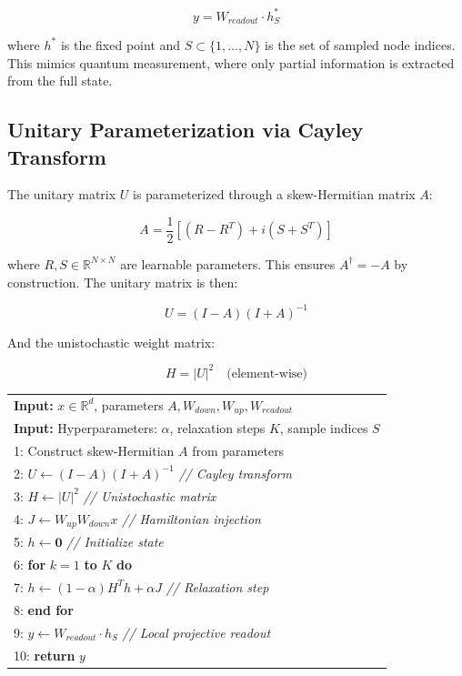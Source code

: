 \documentclass[11pt,a4paper]{article}
\newcommand{\R}{\mathbb{R}}
\begin{document}
\begin{equation}
\label{eq:readout}
y = W_{readout} \cdot h^*_S
\end{equation}

where $h^*$ is the fixed point and $S \subset \{1, \ldots, N\}$ is the set of sampled node indices. This mimics quantum measurement, where only partial information is extracted from the full state.

\subsection{Unitary Parameterization via Cayley Transform}

The unitary matrix $U$ is parameterized through a skew-Hermitian matrix $A$:

\begin{equation}
A = \frac{1}{2}\left[(R - R^T) + i(S + S^T)\right]
\end{equation}

where $R, S \in \R^{N \times N}$ are learnable parameters. This ensures $A^\dagger = -A$ by construction. The unitary matrix is then:

\begin{equation}
U = (I - A)(I + A)^{-1}
\end{equation}

And the unistochastic weight matrix:

\begin{equation}
H = |U|^2 \quad \text{(element-wise)}
\end{equation}

\begin{algorithm}[t]
\caption{MQR Forward Pass}
\label{alg:forward}
\begin{tabular}{@{}l@{}}
\textbf{Input:} $x \in \R^d$, parameters $A, W_{down}, W_{up}, W_{readout}$ \\
\textbf{Input:} Hyperparameters: $\alpha$, relaxation steps $K$, sample indices $S$ \\[0.5em]
1: Construct skew-Hermitian $A$ from parameters \\
2: $U \gets (I - A)(I + A)^{-1}$ \hfill \textit{// Cayley transform} \\
3: $H \gets |U|^2$ \hfill \textit{// Unistochastic matrix} \\
4: $J \gets W_{up} W_{down} x$ \hfill \textit{// Hamiltonian injection} \\
5: $h \gets \mathbf{0}$ \hfill \textit{// Initialize state} \\
6: \textbf{for} $k = 1$ \textbf{to} $K$ \textbf{do} \\
7: \quad $h \gets (1-\alpha)H^T h + \alpha J$ \hfill \textit{// Relaxation step} \\
8: \textbf{end for} \\
9: $y \gets W_{readout} \cdot h_S$ \hfill \textit{// Local projective readout} \\
10: \textbf{return} $y$ \\
\end{tabular}
\end{algorithm}
\end{document}
